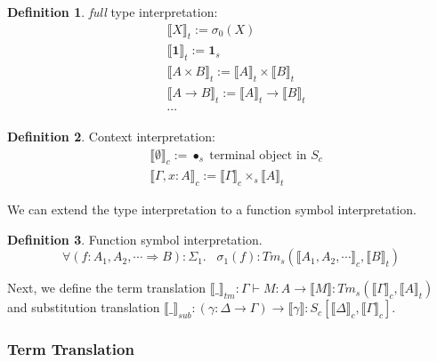 \documentclass[12pt]{article}
\theoremstyle{definition}
\newtheorem{definition}{Definition}[section]
\newcommand{\den}[1]{\llbracket #1 \rrbracket}
\begin{document}
\begin{definition}
    \textit{full} type interpretation: 
    \begin{align*}
        &\den{X}_t := \sigma_0(X)\\
        &\den{\mathbf{1}}_t := \mathbf{1}_s\\
        &\den{A \times B}_t := \den{A}_t \times \den{B}_t\\
        &\den{A \to B}_t := \den{A}_t \to \den{B}_t \\
        &\cdots 
    \end{align*}
\end{definition}

\begin{definition}
    Context interpretation:
    \begin{align*}
        &\den{\emptyset}_c := \bullet_s \;\text{terminal object in }S_c\\
        &\den{\Gamma,x : A}_c := \den{\Gamma}_c \times_s \den{A}_t
    \end{align*}
\end{definition}

We can extend the type interpretation to a function symbol interpretation.
\begin{definition}
    Function symbol interpretation.
\[
  \forall (f : A_1,A_2,\cdots\Rightarrow B) : \Sigma_1. \;\;\; \sigma_1(f) : Tm_s(\den{A_1,A_2,\cdots}_c,\den{B}_t)  
\]
\end{definition}
Next, we define the term translation $\den{\_}_{tm} : \Gamma \vdash M :A \to \den{M} : Tm_s(\den{\Gamma}_c , \den{A}_t)$ and substitution translation $\den{\_}_{sub} : (\gamma : \Delta \to \Gamma) \to \den{\gamma} : S_c[\den{\Delta}_c,\den{\Gamma}_c]$.
\subsubsection{Term Translation}
\end{document}

